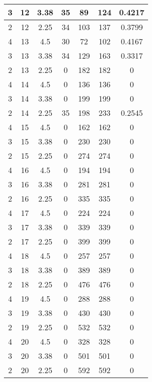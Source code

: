 \documentclass[letterpaper, 12pt]{article}
\begin{document}
\begin{longtable}{|c|c|c|c|c|c|c|}
\hline
3 & 12 & 3.38 & 35 & 89 & 124 & 0.4217 \\
\hline
2 & 12 & 2.25 & 34 & 103 & 137 & 0.3799 \\
\hline
4 & 13 & 4.5 & 30 & 72 & 102 & 0.4167 \\
\hline
3 & 13 & 3.38 & 34 & 129 & 163 & 0.3317 \\
\hline
2 & 13 & 2.25 & 0 & 182 & 182 & 0 \\
\hline
4 & 14 & 4.5 & 0 & 136 & 136 & 0 \\
\hline
3 & 14 & 3.38 & 0 & 199 & 199 & 0 \\
\hline
2 & 14 & 2.25 & 35 & 198 & 233 & 0.2545 \\
\hline
4 & 15 & 4.5 & 0 & 162 & 162 & 0 \\
\hline
3 & 15 & 3.38 & 0 & 230 & 230 & 0 \\
\hline
2 & 15 & 2.25 & 0 & 274 & 274 & 0 \\
\hline
4 & 16 & 4.5 & 0 & 194 & 194 & 0 \\
\hline
3 & 16 & 3.38 & 0 & 281 & 281 & 0 \\
\hline
2 & 16 & 2.25 & 0 & 335 & 335 & 0 \\
\hline
4 & 17 & 4.5 & 0 & 224 & 224 & 0 \\
\hline
3 & 17 & 3.38 & 0 & 339 & 339 & 0 \\
\hline
2 & 17 & 2.25 & 0 & 399 & 399 & 0 \\
\hline
4 & 18 & 4.5 & 0 & 257 & 257 & 0 \\
\hline
3 & 18 & 3.38 & 0 & 389 & 389 & 0 \\
\hline
2 & 18 & 2.25 & 0 & 476 & 476 & 0 \\
\hline
4 & 19 & 4.5 & 0 & 288 & 288 & 0 \\
\hline
3 & 19 & 3.38 & 0 & 430 & 430 & 0 \\
\hline
2 & 19 & 2.25 & 0 & 532 & 532 & 0 \\
\hline
4 & 20 & 4.5 & 0 & 328 & 328 & 0 \\
\hline
3 & 20 & 3.38 & 0 & 501 & 501 & 0 \\
\hline
2 & 20 & 2.25 & 0 & 592 & 592 & 0 \\
\hline
\end{longtable}
\end{document}
